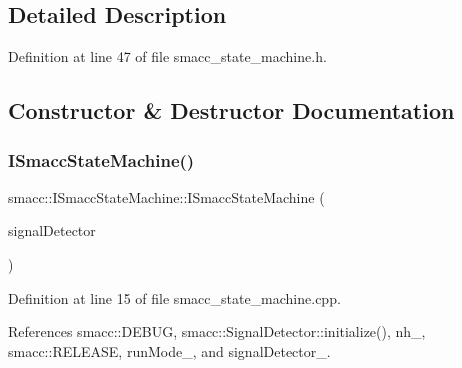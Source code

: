\subsection{Detailed Description}


Definition at line 47 of file smacc\+\_\+state\+\_\+machine.\+h.



\subsection{Constructor \& Destructor Documentation}
\mbox{\label{classsmacc_1_1ISmaccStateMachine_a497c2185584adbec3298d4000277b75e}} 
\subsubsection{\texorpdfstring{I\+Smacc\+State\+Machine()}{ISmaccStateMachine()}}
{\footnotesize\ttfamily smacc\+::\+I\+Smacc\+State\+Machine\+::\+I\+Smacc\+State\+Machine (\begin{DoxyParamCaption}\item[{\hyperlink{classsmacc_1_1SignalDetector}{Signal\+Detector} $\ast$}]{signal\+Detector }\end{DoxyParamCaption})}



Definition at line 15 of file smacc\+\_\+state\+\_\+machine.\+cpp.



References smacc\+::\+D\+E\+B\+UG, smacc\+::\+Signal\+Detector\+::initialize(), nh\+\_\+, smacc\+::\+R\+E\+L\+E\+A\+SE, run\+Mode\+\_\+, and signal\+Detector\+\_\+.


